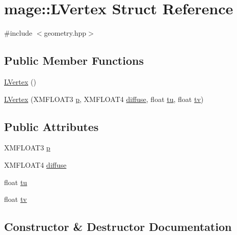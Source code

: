 \hypertarget{structmage_1_1_l_vertex}{}\section{mage\+:\+:L\+Vertex Struct Reference}
\label{structmage_1_1_l_vertex}


{\ttfamily \#include $<$geometry.\+hpp$>$}

\subsection*{Public Member Functions}
\begin{DoxyCompactItemize}
\item 
\hyperlink{structmage_1_1_l_vertex_abfc69fb38d5f37b07d1c420a23a3e7f9}{L\+Vertex} ()
\item 
\hyperlink{structmage_1_1_l_vertex_a262af68c7c50c1003bcbd941b504fe70}{L\+Vertex} (X\+M\+F\+L\+O\+A\+T3 \hyperlink{structmage_1_1_l_vertex_afdf01d172b1992d4e4f37b9ad9fb2d27}{p}, X\+M\+F\+L\+O\+A\+T4 \hyperlink{structmage_1_1_l_vertex_abfe65c089e650ad20ed41de8e2b585dd}{diffuse}, float \hyperlink{structmage_1_1_l_vertex_a820b1dba91a65e4be9a41c4297970dd6}{tu}, float \hyperlink{structmage_1_1_l_vertex_ab5e712d5befd3b8e3b58c772e6d3bf50}{tv})
\end{DoxyCompactItemize}
\subsection*{Public Attributes}
\begin{DoxyCompactItemize}
\item 
X\+M\+F\+L\+O\+A\+T3 \hyperlink{structmage_1_1_l_vertex_afdf01d172b1992d4e4f37b9ad9fb2d27}{p}
\item 
X\+M\+F\+L\+O\+A\+T4 \hyperlink{structmage_1_1_l_vertex_abfe65c089e650ad20ed41de8e2b585dd}{diffuse}
\item 
float \hyperlink{structmage_1_1_l_vertex_a820b1dba91a65e4be9a41c4297970dd6}{tu}
\item 
float \hyperlink{structmage_1_1_l_vertex_ab5e712d5befd3b8e3b58c772e6d3bf50}{tv}
\end{DoxyCompactItemize}


\subsection{Constructor \& Destructor Documentation}
\hypertarget{structmage_1_1_l_vertex_abfc69fb38d5f37b07d1c420a23a3e7f9}{}\label{structmage_1_1_l_vertex_abfc69fb38d5f37b07d1c420a23a3e7f9} 
